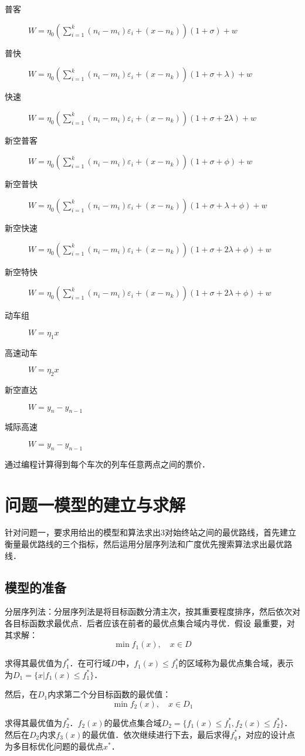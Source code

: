\documentclass[UTF8]{ctexart}
\begin{document}
\begin{description}
  \item[普客] $W = \eta_0 (\sum_{i=1}^k (n_i - m_i)\varepsilon_i + (x - n_k))(1+\sigma)+w$
  \item[普快] $W = \eta_0 (\sum_{i=1}^k (n_i - m_i)\varepsilon_i + (x - n_k))(1+\sigma+\lambda)+w$
  \item[快速] $W = \eta_0 (\sum_{i=1}^k (n_i - m_i)\varepsilon_i + (x - n_k))(1+\sigma+2\lambda)+w$
  \item[新空普客] $W = \eta_0 (\sum_{i=1}^k (n_i - m_i)\varepsilon_i + (x - n_k))(1+\sigma+\phi)+w$
  \item[新空普快] $W = \eta_0 (\sum_{i=1}^k (n_i - m_i)\varepsilon_i + (x - n_k))(1+\sigma+\lambda+\phi)+w$
  \item[新空快速] $W = \eta_0 (\sum_{i=1}^k (n_i - m_i)\varepsilon_i + (x - n_k))(1+\sigma+2\lambda+\phi)+w$
  \item[新空特快] $W = \eta_0 (\sum_{i=1}^k (n_i - m_i)\varepsilon_i + (x - n_k))(1+\sigma+2\lambda+\phi)+w$
  \item[动车组] $W = \eta_1 x$
  \item[高速动车] $W = \eta_2 x$
  \item[新空直达] $W = y_n - y_{n-1}$
  \item[城际高速] $W = y_n - y_{n-1}$
\end{description}
通过编程计算得到每个车次的列车任意两点之间的票价．

\section{问题一模型的建立与求解}
针对问题一，要求用给出的模型和算法求出3对始终站之间的最优路线，首先建立衡量最优路线的三个指标，然后运用分层序列法和广度优先搜索算法求出最优路线．

\subsection{模型的准备}
分层序列法：分层序列法是将目标函数分清主次，按其重要程度排序，然后依次对各目标函数求最优点．后者应该在前者的最优点集合域内寻优．假设 最重要，对其求解：
$$\min f_1(x), \quad x \in D$$

求得其最优值为$f_1^*$．在可行域$D$中，$f_1(x) \leq f_1^*$的区域称为最优点集合域，表示为$D_1 = \{x|f_1(x) \leq f_1^*\}$．

然后，在$D_1$内求第二个分目标函数的最优值：
$$\min f_2(x), \quad x \in D_1$$

求得其最优值为$f_2^*$．$f_2(x)$的最优点集合域$D_2 = \{f_1(x)\leq f_1^*, f_2(x)\leq f_2^*\}$． 然后在$D_2$内求$f_3(x)$的最优值．依次继续进行下去，最后求得$f_q^*$，对应的设计点为多目标优化问题的最优点$x^*$．
\end{document}
